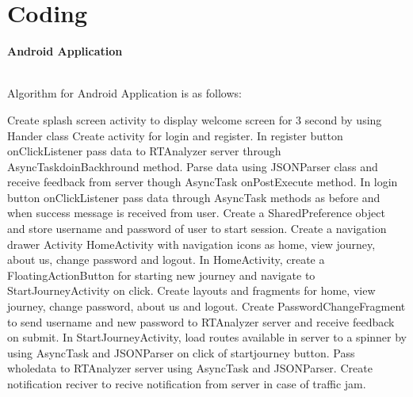 \chapter{Coding}

\textbf{Android Application}
\\
\\
\begin{algorithm}
\begin{algorithmic}[1]
\caption{Algorithm for Android Application is as follows:}

\State Create splash screen activity to display welcome screen for 3 second by using Hander class
\State Create activity for login and register. In register button onClickListener pass data to RTAnalyzer server through AsyncTaskdoinBackhround method. Parse data using JSONParser class and receive feedback from server though AsyncTask onPostExecute method.
\State In login button onClickListener pass data through AsyncTask methods as before and when success message is received from user. Create a SharedPreference object and store username and password of user to start session.
\State Create a navigation drawer Activity HomeActivity with navigation icons as home, view journey, about us, change password and logout. 
\State In HomeActivity, create a FloatingActionButton for starting new journey and navigate to StartJourneyActivity on click.
\State Create layouts and fragments for home, view journey, change password, about us and logout.
\State Create PasswordChangeFragment to send username and new password to RTAnalyzer server and receive feedback on submit.
\State In StartJourneyActivity, load routes available in server to a spinner by using AsyncTask and JSONParser on click of startjourney button. Pass wholedata to RTAnalyzer server using AsyncTask and JSONParser.
\State Create notification reciver to recive notification from server in case of traffic jam.
\end{algorithmic}
\end{algorithm}

